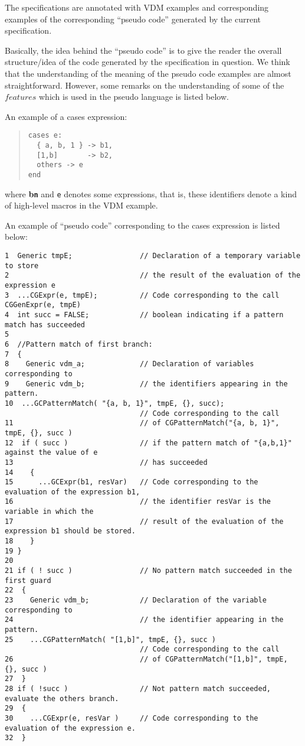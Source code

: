 \documentclass[a4paper,dvips]{article}
\begin{document}
The specifications are annotated with VDM examples and corresponding
examples of the corresponding ``pseudo code'' generated by the current
specification. 

Basically, the idea behind the ``pseudo code'' is to give the reader
the overall structure/idea of the code generated by the specification
in question. We think that the understanding of the meaning of the
pseudo code examples are almost straightforward. However, some remarks
on the understanding of some of the $features$ which is used in
the pseudo language is listed below.

An example of a cases expression:
\begin{quote}
\begin{verbatim}
cases e:
  { a, b, 1 } -> b1,
  [1,b]       -> b2,
  others -> e 
end 
\end{verbatim} 
\end{quote}

where {\bf b{\tt n}} and {\tt e} denotes some expressions, that is,
these identifiers denote a kind of high-level macros in the VDM
example.


An example of ``pseudo code'' corresponding to the cases expression is
listed below:

\begin{small}
\begin{verbatim}
1  Generic tmpE;                // Declaration of a temporary variable to store 
2                               // the result of the evaluation of the expression e
3  ...CGExpr(e, tmpE);          // Code corresponding to the call CGGenExpr(e, tmpE)
4  int succ = FALSE;            // boolean indicating if a pattern match has succeeded
5
6  //Pattern match of first branch:
7  {
8    Generic vdm_a;             // Declaration of variables corresponding to
9    Generic vdm_b;             // the identifiers appearing in the pattern.
10  ...GCPatternMatch( "{a, b, 1}", tmpE, {}, succ);
                                // Code corresponding to the call 
11                              // of CGPatternMatch("{a, b, 1}", tmpE, {}, succ )
12  if ( succ )                 // if the pattern match of "{a,b,1}" against the value of e
13                              // has succeeded
14    {
15      ...GCExpr(b1, resVar)   // Code corresponding to the evaluation of the expression b1,
16                              // the identifier resVar is the variable in which the 
17                              // result of the evaluation of the expression b1 should be stored.
18    }
19 }
20
21 if ( ! succ )                // No pattern match succeeded in the first guard
22  {
23    Generic vdm_b;            // Declaration of the variable corresponding to 
24                              // the identifier appearing in the pattern.
25    ...CGPatternMatch( "[1,b]", tmpE, {}, succ ) 
                                // Code corresponding to the call
26                              // of CGPatternMatch("[1,b]", tmpE, {}, succ )
27  }
28 if ( !succ )                 // Not pattern match succeeded, evaluate the others branch.
29  {
30    ...CGExpr(e, resVar )     // Code corresponding to the evaluation of the expression e.
32  }
\end{verbatim}
\end{small}
\end{document}
